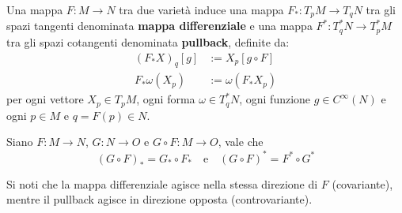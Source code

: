 \begin{definition}
   Una mappa $F : M \to N$ tra due varietà induce una mappa
   $F_* : T_p M \to T_q N$ tra gli spazi tangenti denominata
   \textbf{mappa differenziale} e una mappa
   $F^* : T^*_q N \to T^*_p M$ tra gli spazi cotangenti denominata
   \textbf{pullback}, definite da:
   \begin{equation}
      \begin{aligned}
         (F_*X)_q [g] & := X_p [g \circ F] \\
         F_*\omega (X_p) & := \omega (F_* X_p)
      \end{aligned}
   \end{equation}
   per ogni vettore $X_p \in T_p M$, ogni forma $\omega \in T^*_q N$,
   ogni funzione $g \in C^\infty(N)$ e  ogni $p \in M$ e $q=F(p) \in N$.
\end{definition}


Siano $F : M \to N$, $G : N \to O$ e $G \circ F : M \to O$, vale che
$$
   (G \circ F)_* = G_* \circ F_* \quad \mathrm{e} \quad
   (G \circ F)^* = F^* \circ G^*
$$

Si noti che la mappa differenziale agisce nella stessa direzione di $F$ (covariante),
mentre il pullback agisce in direzione opposta (controvariante).
